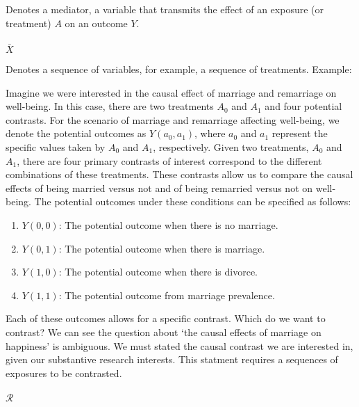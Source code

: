 \documentclass[
  single column]{article}
\makeatletter
\let\oldparagraph\paragraph
\renewcommand{\paragraph}{
    \@ifstar
      \xxxParagraphStar
      \xxxParagraphNoStar
  }
\newcommand{\xxxParagraphStar}[1]{\oldparagraph*{#1}\mbox{}}
\newcommand{\xxxParagraphNoStar}[1]{\oldparagraph{#1}\mbox{}}
\providecommand{\tightlist}{%
  \setlength{\itemsep}{0pt}\setlength{\parskip}{0pt}}\usepackage{longtable,booktabs,array}
\makeatother
\begin{document}
Denotes a mediator, a variable that transmits the effect of an exposure
(or treatment) \(A\) on an outcome \(Y\).

\paragraph{\texorpdfstring{\(\bar{X}\)}{\textbackslash bar\{X\}}}\label{barx}

Denotes a sequence of variables, for example, a sequence of treatments.
Example:

Imagine we were interested in the causal effect of marriage and
remarriage on well-being. In this case, there are two treatments \(A_0\)
and \(A_1\) and four potential contrasts. For the scenario of marriage
and remarriage affecting well-being, we denote the potential outcomes as
\(Y(a_0, a_1)\), where \(a_0\) and \(a_1\) represent the specific values
taken by \(A_0\) and \(A_1\), respectively. Given two treatments,
\(A_0\) and \(A_1\), there are four primary contrasts of interest
correspond to the different combinations of these treatments. These
contrasts allow us to compare the causal effects of being married versus
not and of being remarried versus not on well-being. The potential
outcomes under these conditions can be specified as follows:

\begin{enumerate}
\def\labelenumi{\arabic{enumi}.}
\tightlist
\item
  \(Y(0, 0)\): The potential outcome when there is no marriage.
\item
  \(Y(0, 1)\): The potential outcome when there is marriage.
\item
  \(Y(1, 0)\): The potential outcome when there is divorce.
\item
  \(Y(1, 1)\): The potential outcome from marriage prevalence.
\end{enumerate}

Each of these outcomes allows for a specific contrast. Which do we want
to contrast? We can see the question about `the causal effects of
marriage on happiness' is ambiguous. We must stated the causal contrast
we are interested in, given our substantive research interests. This
statment requires a sequences of exposures to be contrasted.

\paragraph{\texorpdfstring{\(\mathcal{R}\)}{\textbackslash mathcal\{R\}}}\label{mathcalr}
\end{document}
